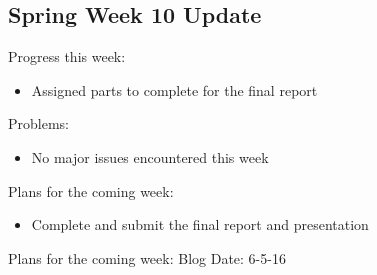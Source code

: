 \subsection{Spring Week 10 Update}
Progress this week:
\begin{itemize}
   \item Assigned parts to complete for the final report
\end{itemize}
Problems:
\begin{itemize}
   \item No major issues encountered this week
\end{itemize}
Plans for the coming week:
\begin{itemize}
   \item Complete and submit the final report and presentation
\end{itemize}
Plans for the coming week:
Blog Date: 6-5-16
